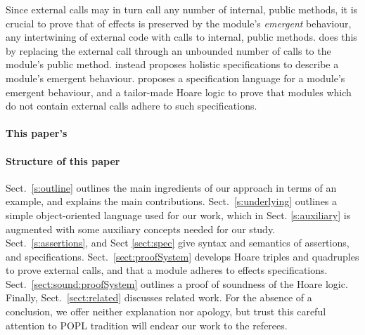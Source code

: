 Since external calls may in turn call any number of internal, public methods, 
it is crucial  to prove that \taming of effects is preserved by the module's 
\emph{emergent} behaviour, \ie any intertwining of external code with calls to internal, public methods.
\citet{CassezFQ24} 
does this by replacing the external call through an unbounded number of calls to the module's public method.
\citet{FASE} instead proposes holistic specifications to describe a module's emergent behaviour. 
\citet{OOPSLA22} proposes a specification language for a module's emergent behaviour, and a tailor-made Hoare logic to prove that modules which do not contain external calls adhere to such specifications.




\paragraph{This paper's } %

 \paragraph{Structure of this paper}
Sect.\ \ref{s:outline}   outlines the main ingredients of our approach in terms of an example, and explains the main contributions.
Sect.\ \ref{s:underlying} outlines a simple object-oriented language used for our work, which in Sect. \ref{s:auxiliary} is augmented with some auxiliary concepts needed for our study.
Sect.\ \ref{s:assertions}, and Sect \ref{sect:spec}  give syntax and semantics of  assertions, and  specifications.
Sect.\ \ref{sect:proofSystem} develops Hoare triples and quadruples to prove external calls, and that a module adheres to \tamed effects specifications.
Sect.\ \ref{sect:sound:proofSystem} outlines a proof of soundness of
the Hoare logic. Finally, Sect.\ \ref{sect:related} discusses related
work. For the absence of a conclusion, we offer neither explanation
nor apology, but trust this careful attention to POPL tradition will
endear our work to the referees.
 
